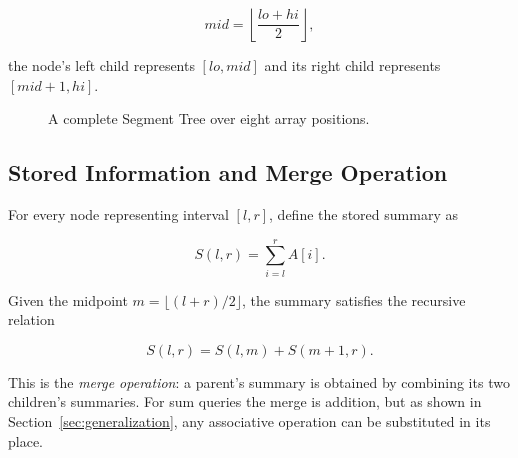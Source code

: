 \documentclass[11pt,open=any,headings=option]{scrreprt}
\begin{document}
\begin{equation}
mid = \left\lfloor \frac{lo+hi}{2} \right\rfloor,
\end{equation}

the node's left child represents $[lo, mid]$ and its right child represents $[mid+1, hi]$.

\begin{figure}[H]
\centering
{}
\caption{A complete Segment Tree over eight array positions.}
\label{fig:segment-tree-structure}
\end{figure}

\subsection{Stored Information and Merge Operation}
For every node representing interval $[l,r]$, define the stored summary as

\begin{equation}
S(l,r) = \sum_{i=l}^{r} A[i].
\end{equation}

Given the midpoint $m = \lfloor (l+r)/2 \rfloor$, the summary satisfies the recursive relation

\begin{equation}
S(l,r) = S(l,m) + S(m+1,r).
\label{eq:merge}
\end{equation}

This is the \emph{merge operation}: a parent's summary is obtained by combining its two children's summaries. For sum queries the merge is addition, but as shown in Section~\ref{sec:generalization}, any associative operation can be substituted in its place.
\end{document}
